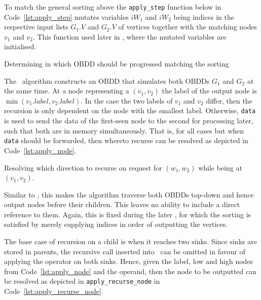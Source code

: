 To match the general sorting above the \lstinline{apply_step} function below in
Code~\ref{lst:apply_step} mutates variables $\mathit{iW}_1$ and $\mathit{iW}_2$
being indices in the respective input lists $G_1.V$ and $G_2.V$ of vertices
together with the matching nodes $v_1$ and $v_2$. This function used later in
\Apply, where the mutated variables are initialised.
\begin{lstfloat}
  \centering

  

  \caption{Determining in which OBDD should be progressed matching the sorting}
  \label{lst:apply_step}
\end{lstfloat}

The \Apply\ algorithm constructs an OBDD that simulates both OBDDs $G_1$ and
$G_2$ at the same time. At a node representing a $(v_1,v_2)$ the label of the
output node is $\min(v_1.\mathit{label},v_2.\mathit{label})$. In the case the
two labels of $v_1$ and $v_2$ differ, then the recursion is only dependent on
the node with the smallest label. Otherwise, \lstinline{data} is used to send
the data of the first-seen node to the second for processing later, such that
both are in memory simultaneously. That is, for all cases but when
\lstinline{data} should be forwarded, then whereto recurse can be resolved as
depicted in Code~\ref{lst:apply_node}.

\begin{lstfloat}[ht!]
  \centering

  

  \caption{Resolving which direction to recurse on request for $(w_1, w_2)$ while
    being at $(v_1, v_2)$.}
  \label{lst:apply_node}
\end{lstfloat}

Similar to \Restrict, this makes the algorithm traverse both OBDDs top-down
and hence output nodes before their children. This leaves no ability to include
a direct reference to them. Again, this is fixed during the later \Reduce, for
which the sorting is satisfied by merely supplying indices in order of
outputting the vertices.

The base case of recursion on a child is when it reaches two sinks. Since sinks
are stored in parents, the recursive call inserted into \ApplyQrec\ can be
omitted in favour of applying the operator on both sinks. Hence, given the
label, low and high nodes from Code~\ref{lst:apply_node} and the operand, then
the node to be outputted can be resolved as depicted in
\lstinline{apply_recurse_node} in Code~\ref{lst:apply_recurse_node}.

